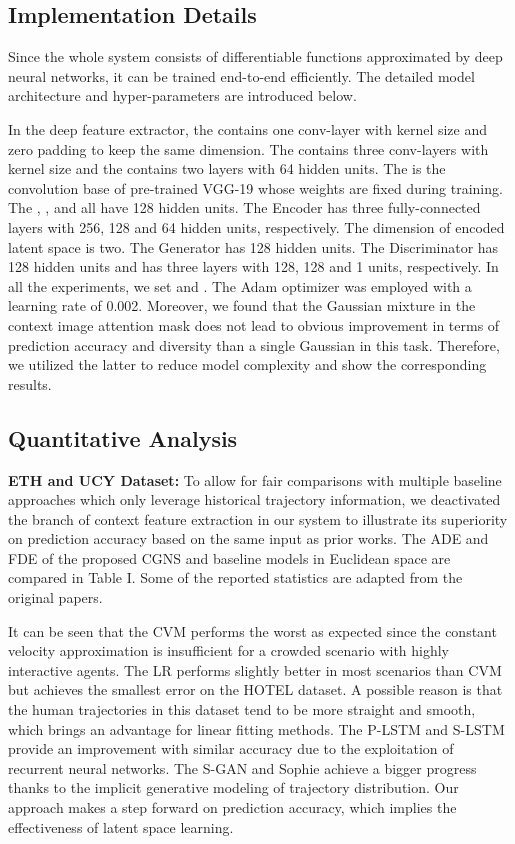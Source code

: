 \documentclass[letterpaper, 10 pt, conference]{ieeeconf}
\begin{document}
\subsection{Implementation Details}
Since the whole system consists of differentiable functions approximated by deep neural networks, it can be trained end-to-end efficiently. The detailed model architecture and hyper-parameters are introduced below.

In the deep feature extractor, the  contains one conv-layer with kernel size  and zero padding to keep the same dimension. The  contains three conv-layers with kernel size  and the  contains two layers with 64 hidden units. The  is the convolution base of pre-trained VGG-19 whose weights are fixed during training. The , ,  and  all have 128 hidden units.
The Encoder  has three fully-connected layers with 256, 128 and 64 hidden units, respectively. The dimension of encoded latent space is two.
The Generator  has 128 hidden units. The Discriminator  has 128 hidden units and  has three layers with 128, 128 and 1 units, respectively.
In all the experiments, we set  and .
The Adam optimizer was employed with a learning rate of 0.002. 
Moreover, we found that the Gaussian mixture in the context image attention mask does not lead to obvious improvement in terms of prediction accuracy and diversity than a single Gaussian in this task. Therefore, we utilized the latter to reduce model complexity and show the corresponding results.


\subsection{Quantitative Analysis}
\textbf{ETH and UCY Dataset:} 
To allow for fair comparisons with multiple baseline approaches which only leverage historical trajectory information, we deactivated the branch of context feature extraction in our system to illustrate its superiority on prediction accuracy based on the same input as prior works.
The ADE and FDE of the proposed CGNS and baseline models in Euclidean space are compared in Table I. Some of the reported statistics are adapted from the original papers.

It can be seen that the CVM performs the worst as expected since the constant velocity approximation is insufficient for a crowded scenario with highly interactive agents.
The LR performs slightly better in most scenarios than CVM but achieves the smallest error on the HOTEL dataset. A possible reason is that the human trajectories in this dataset tend to be more straight and smooth, which brings an advantage for linear fitting methods.
The P-LSTM and S-LSTM provide an improvement with similar accuracy due to the exploitation of recurrent neural networks.
The S-GAN and Sophie achieve a bigger progress thanks to the implicit generative modeling of trajectory distribution.
Our approach makes a step forward on prediction accuracy, which implies the effectiveness of latent space learning.
\end{document}
